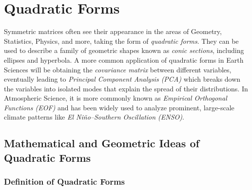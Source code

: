 \chapter{Quadratic Forms}

Symmetric matrices often see their appearance in the areas of Geometry, Statistics, Physics, and more, taking the form of \textit{quadratic forms}. They can be used to describe a family of geometric shapes known as \textit{conic sections}, including ellipses and hyperbola. A more common application of quadratic forms in Earth Sciences will be obtaining the \textit{covariance matrix} between different variables, eventually leading to \textit{Principal Component Analysis (PCA)} which breaks down the variables into isolated modes that explain the spread of their distributions. In Atmospheric Science, it is more commonly known as \textit{Empirical Orthogonal Functions (EOF)} and has been widely used to analyze prominent, large-scale climate patterns like \textit{El Niño–Southern Oscillation (ENSO)}. 

\section{Mathematical and Geometric Ideas of Quadratic Forms}
\subsection{Definition of Quadratic Forms}

